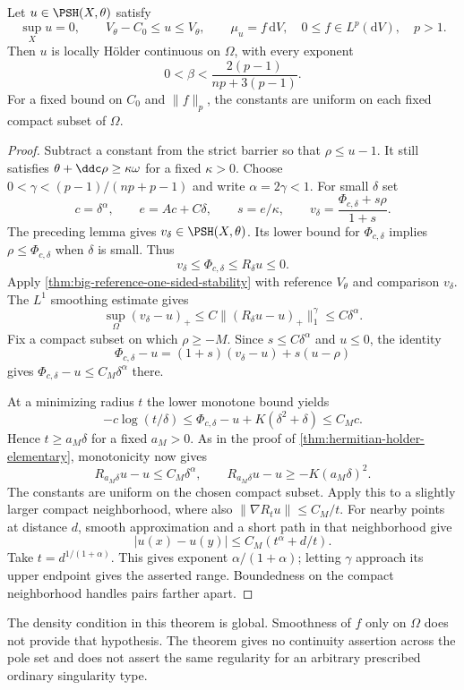 \begin{theorem}\label{thm:big-minimal-holder}
Let $u\in\PSH(X,\theta)$ satisfy
\[
 \sup_Xu=0,\qquad V_\theta-C_0\leq u\leq V_\theta,
 \qquad\mu_u=f\,\mathrm{d}V,
 \quad0\leq f\in L^p(\mathrm{d}V),\quad p>1.
\]
Then $u$ is locally H\"older continuous on $\Omega$, with every exponent
\[
 0<\beta<\frac{2(p-1)}{np+3(p-1)}.
\]
For a fixed bound on $C_0$ and $\|f\|_p$, the constants are uniform on
each fixed compact subset of $\Omega$.
\end{theorem}

\begin{proof}
Subtract a constant from the strict barrier so that $\rho\leq u-1$.
It still satisfies $\theta+\ddc\rho\geq\kappa\omega$ for a fixed
$\kappa>0$. Choose
$0<\gamma<(p-1)/(np+p-1)$ and write $\alpha=2\gamma<1$.
For small $\delta$ set
\[
 c=\delta^\alpha,\qquad e=Ac+C\delta,\qquad s=e/\kappa,
 \qquad v_\delta=\frac{\Phi_{c,\delta}+s\rho}{1+s}.
\]
The preceding lemma gives $v_\delta\in\PSH(X,\theta)$. Its lower bound
for $\Phi_{c,\delta}$ implies $\rho\leq\Phi_{c,\delta}$ when $\delta$
is small. Thus
\[
 v_\delta\leq\Phi_{c,\delta}\leq R_\delta u\leq0.
\]
Apply \cref{thm:big-reference-one-sided-stability} with reference
$V_\theta$ and comparison $v_\delta$. The $L^1$ smoothing estimate gives
\[
 \sup_\Omega(v_\delta-u)_+
 \leq C\|(R_\delta u-u)_+\|_1^\gamma\leq C\delta^\alpha.
\]
Fix a compact subset on which $\rho\geq-M$. Since $s\leq C\delta^\alpha$
and $u\leq0$, the identity
\[
 \Phi_{c,\delta}-u=(1+s)(v_\delta-u)+s(u-\rho)
\]
gives $\Phi_{c,\delta}-u\leq C_M\delta^\alpha$ there.

At a minimizing radius $t$ the lower monotone bound yields
\[
 -c\log(t/\delta)\leq\Phi_{c,\delta}-u+K(\delta^2+\delta)
 \leq C_Mc.
\]
Hence $t\geq a_M\delta$ for a fixed $a_M>0$. As in the proof of
\cref{thm:hermitian-holder-elementary}, monotonicity now gives
\[
 R_{a_M\delta}u-u\leq C_M\delta^\alpha,
 \qquad R_{a_M\delta}u-u\geq-K(a_M\delta)^2.
\]
The constants are uniform on the chosen compact subset. Apply this to a
slightly larger compact neighborhood, where also
$\|\nabla R_tu\|\leq C_M/t$. For nearby points at distance $d$, smooth
approximation and a short path in that neighborhood give
\[
 |u(x)-u(y)|\leq C_M(t^\alpha+d/t).
\]
Take $t=d^{1/(1+\alpha)}$. This gives exponent
$\alpha/(1+\alpha)$; letting $\gamma$ approach its upper endpoint gives
the asserted range. Boundedness on the compact neighborhood handles
pairs farther apart.
\end{proof}

The density condition in this theorem is global. Smoothness of $f$ only
on $\Omega$ does not provide that hypothesis. The theorem gives no
continuity assertion across the pole set and does not assert the same
regularity for an arbitrary prescribed ordinary singularity type.
